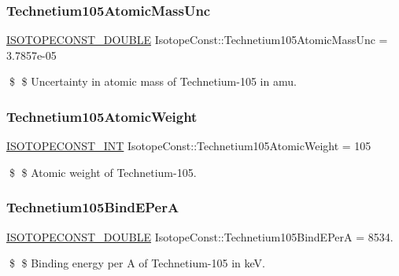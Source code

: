\subsubsection{\texorpdfstring{Technetium105\+Atomic\+Mass\+Unc}{Technetium105AtomicMassUnc}}
{\footnotesize\ttfamily \mbox{\hyperlink{group___isotope_const-_macros_ga8f45a7272ce02c0b4c65c44636ed719a}{I\+S\+O\+T\+O\+P\+E\+C\+O\+N\+S\+T\+\_\+\+D\+O\+U\+B\+LE}} Isotope\+Const\+::\+Technetium105\+Atomic\+Mass\+Unc = 3.\+7857e-\/05}

\$ \$ Uncertainty in atomic mass of Technetium-\/105 in amu. \mbox{\label{group___isotope_const-_technetium-_tc105_ga980b6a4653fa7ae34e34d6234528de48}} 
\subsubsection{\texorpdfstring{Technetium105\+Atomic\+Weight}{Technetium105AtomicWeight}}
{\footnotesize\ttfamily \mbox{\hyperlink{group___isotope_const-_macros_ga5f18360b3e99483a35c32d789e62621c}{I\+S\+O\+T\+O\+P\+E\+C\+O\+N\+S\+T\+\_\+\+I\+NT}} Isotope\+Const\+::\+Technetium105\+Atomic\+Weight = 105}

\$ \$ Atomic weight of Technetium-\/105. \mbox{\label{group___isotope_const-_technetium-_tc105_gad2fc91bc61a914402774ec074f44efd1}} 
\subsubsection{\texorpdfstring{Technetium105\+Bind\+E\+PerA}{Technetium105BindEPerA}}
{\footnotesize\ttfamily \mbox{\hyperlink{group___isotope_const-_macros_ga8f45a7272ce02c0b4c65c44636ed719a}{I\+S\+O\+T\+O\+P\+E\+C\+O\+N\+S\+T\+\_\+\+D\+O\+U\+B\+LE}} Isotope\+Const\+::\+Technetium105\+Bind\+E\+PerA = 8534.}

\$ \$ Binding energy per A of Technetium-\/105 in keV. \mbox{\label{group___isotope_const-_technetium-_tc105_ga3d26eb38d33f420dae0eaf67e355f839}} 
